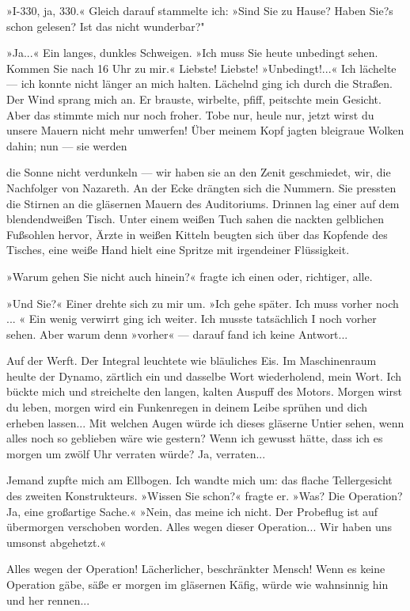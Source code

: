»I-330, ja, 330.« Gleich darauf stammelte ich: »Sind Sie zu Hause?
Haben Sie?s schon gelesen? Ist das nicht wunderbar?"

»Ja...« Ein langes, dunkles Schweigen. »Ich muss Sie heute
unbedingt sehen. Kommen Sie nach 16 Uhr zu mir.« Liebste! Liebste!
»Unbedingt!...« Ich lächelte — ich konnte nicht länger an mich
halten. Lächelnd ging ich durch die Straßen. Der Wind sprang mich
an. Er brauste, wirbelte, pfiff, peitschte mein Gesicht. Aber das
stimmte mich nur noch froher. Tobe nur, heule nur, jetzt wirst du
unsere Mauern nicht mehr umwerfen! Über meinem Kopf jagten
bleigraue Wolken dahin; nun — sie werden

die Sonne nicht verdunkeln — wir haben sie an den Zenit
geschmiedet, wir, die Nachfolger von Nazareth. An der Ecke drängten
sich die Nummern. Sie pressten die Stirnen an die gläsernen Mauern
des Auditoriums. Drinnen lag einer auf dem blendendweißen Tisch.
Unter einem weißen Tuch sahen die nackten gelblichen Fußsohlen
hervor, Ärzte in weißen Kitteln beugten sich über das Kopfende des
Tisches, eine weiße Hand hielt eine Spritze mit irgendeiner
Flüssigkeit.

»Warum gehen Sie nicht auch hinein?« fragte ich einen oder,
richtiger, alle.

»Und Sie?« Einer drehte sich zu mir um. »Ich gehe später. Ich muss
vorher noch ... « Ein wenig verwirrt ging ich weiter. Ich musste
tatsächlich I noch vorher sehen. Aber warum denn »vorher« — darauf
fand ich keine Antwort...

Auf der Werft. Der Integral leuchtete wie bläuliches Eis. Im
Maschinenraum heulte der Dynamo, zärtlich ein und dasselbe Wort
wiederholend, mein Wort. Ich bückte mich und streichelte den
langen, kalten Auspuff des Motors. Morgen wirst du leben, morgen
wird ein Funkenregen in deinem Leibe sprühen und dich erheben
lassen... Mit welchen Augen würde ich dieses gläserne Untier sehen,
wenn alles noch so geblieben wäre wie gestern? Wenn ich gewusst
hätte, dass ich es morgen um zwölf Uhr verraten würde? Ja,
verraten...

Jemand zupfte mich am Ellbogen. Ich wandte mich um: das flache
Tellergesicht des zweiten Konstrukteurs. »Wissen Sie schon?« fragte
er. »Was? Die Operation? Ja, eine großartige Sache.« »Nein, das
meine ich nicht. Der Probeflug ist auf übermorgen verschoben
worden. Alles wegen dieser Operation... Wir haben uns umsonst
abgehetzt.«

Alles wegen der Operation! Lächerlicher, beschränkter Mensch! Wenn
es keine Operation gäbe, säße er morgen im gläsernen Käfig, würde
wie wahnsinnig hin und her rennen...

